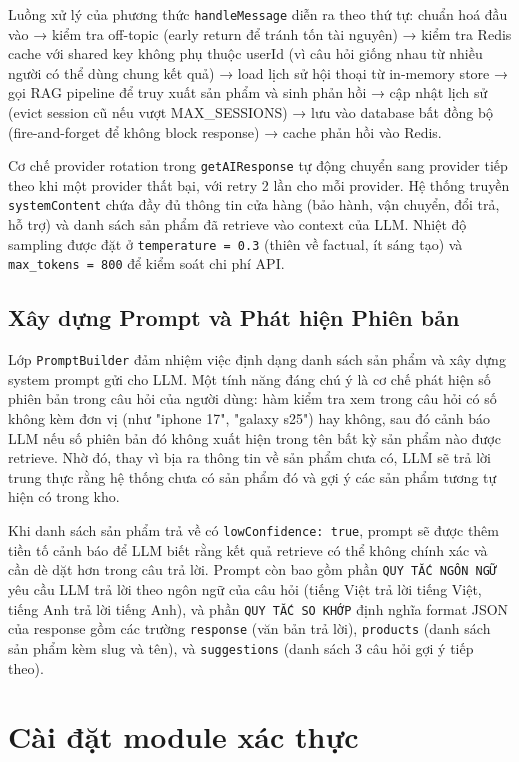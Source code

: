 Luồng xử lý của phương thức \texttt{handleMessage} diễn ra theo thứ tự: chuẩn hoá đầu vào → kiểm tra off-topic (early return để tránh tốn tài nguyên) → kiểm tra Redis cache với shared key không phụ thuộc userId (vì câu hỏi giống nhau từ nhiều người có thể dùng chung kết quả) → load lịch sử hội thoại từ in-memory store → gọi RAG pipeline để truy xuất sản phẩm và sinh phản hồi → cập nhật lịch sử (evict session cũ nếu vượt MAX\_SESSIONS) → lưu vào database bất đồng bộ (fire-and-forget để không block response) → cache phản hồi vào Redis.

Cơ chế provider rotation trong \texttt{getAIResponse} tự động chuyển sang provider tiếp theo khi một provider thất bại, với retry 2 lần cho mỗi provider. Hệ thống truyền \texttt{systemContent} chứa đầy đủ thông tin cửa hàng (bảo hành, vận chuyển, đổi trả, hỗ trợ) và danh sách sản phẩm đã retrieve vào context của LLM. Nhiệt độ sampling được đặt ở \texttt{temperature = 0.3} (thiên về factual, ít sáng tạo) và \texttt{max\_tokens = 800} để kiểm soát chi phí API.

\subsection{Xây dựng Prompt và Phát hiện Phiên bản}

Lớp \texttt{PromptBuilder} đảm nhiệm việc định dạng danh sách sản phẩm và xây dựng system prompt gửi cho LLM. Một tính năng đáng chú ý là cơ chế phát hiện số phiên bản trong câu hỏi của người dùng: hàm kiểm tra xem trong câu hỏi có số không kèm đơn vị (như "iphone 17", "galaxy s25") hay không, sau đó cảnh báo LLM nếu số phiên bản đó không xuất hiện trong tên bất kỳ sản phẩm nào được retrieve. Nhờ đó, thay vì bịa ra thông tin về sản phẩm chưa có, LLM sẽ trả lời trung thực rằng hệ thống chưa có sản phẩm đó và gợi ý các sản phẩm tương tự hiện có trong kho.

Khi danh sách sản phẩm trả về có \texttt{lowConfidence: true}, prompt sẽ được thêm tiền tố cảnh báo để LLM biết rằng kết quả retrieve có thể không chính xác và cần dè dặt hơn trong câu trả lời. Prompt còn bao gồm phần \texttt{QUY TẮC NGÔN NGỮ} yêu cầu LLM trả lời theo ngôn ngữ của câu hỏi (tiếng Việt trả lời tiếng Việt, tiếng Anh trả lời tiếng Anh), và phần \texttt{QUY TẮC SO KHỚP} định nghĩa format JSON của response gồm các trường \texttt{response} (văn bản trả lời), \texttt{products} (danh sách sản phẩm kèm slug và tên), và \texttt{suggestions} (danh sách 3 câu hỏi gợi ý tiếp theo).

\section{Cài đặt module xác thực}

